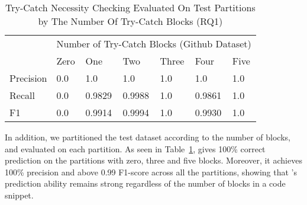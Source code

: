 \begin{table}[t]%
  \caption{Try-Catch Necessity Checking Evaluated On Test Partitions by The Number Of Try-Catch Blocks (RQ1) }
  \vspace{-12pt}
  \small
	\begin{center}
		\renewcommand{\arraystretch}{1}
		\begin{tabular}{| p{1.0cm}<{\centering} | p{0.7cm}<{\centering} | p{0.7cm}<{\centering}| p{0.7cm}<{\centering} | p{0.7cm}<{\centering} | p{0.7cm}<{\centering} | p{0.7cm}<{\centering} | }
		  \hline
			\multirow{2}{*}{} & \multicolumn{6}{c|}{Number of Try-Catch Blocks (Github Dataset)} \\
			\cline{2-7}
			  & Zero  & One & Two & Three & Four & Five\\
			\hline
			Precision & 0.0 &  1.0 & 1.0 & 1.0 & 1.0 & 1.0\\
			\hline
			Recall   & 0.0 &  0.9829 & 0.9988 & 1.0 & 0.9861 & 1.0\\
			\hline
			F1   & 0.0  &  0.9914 & 0.9994 & 1.0 & 0.9930 & 1.0\\
			\hline
		\end{tabular}
		\label{tab:rq1-detailed-result}
	\end{center}
\end{table}

In addition, we partitioned the test dataset according to the number
of  blocks, and evaluated {\xblock} on each
partition. As seen in Table~\ref{tab:rq1-detailed-result}, {\xblock}
gives 100\% correct prediction on the partitions with zero, three and
five  blocks. Moreover, it achieves 100\% precision
and above 0.99 F1-score across all the partitions, showing that
{\xblock}'s prediction ability remains strong regardless of the number
of  blocks in a code snippet.




